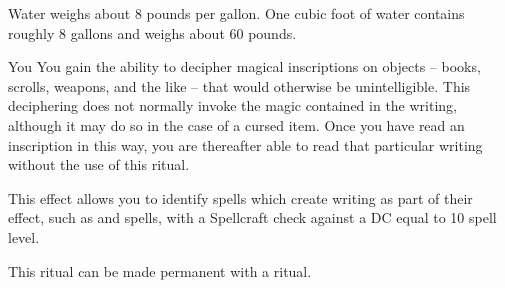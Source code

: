 Water weighs about 8 pounds per gallon. One cubic foot of water contains roughly 8 gallons and weighs about 60 pounds.

\spelldur{\durlong}
\begin{spelltarget}{You}
    \spelleffect You gain the ability to decipher magical inscriptions on objects -- books, scrolls, weapons, and the like -- that would otherwise be unintelligible. This deciphering does not normally invoke the magic contained in the writing, although it may do so in the case of a cursed item. Once you have read an inscription in this way, you are thereafter able to read that particular writing without the use of this ritual.

    This effect allows you to identify spells which create writing as part of their effect, such as  and  spells, with a Spellcraft check against a DC equal to 10 \add spell level.
\end{spelltarget}
\spellnotes This ritual can be made permanent with a  ritual.


